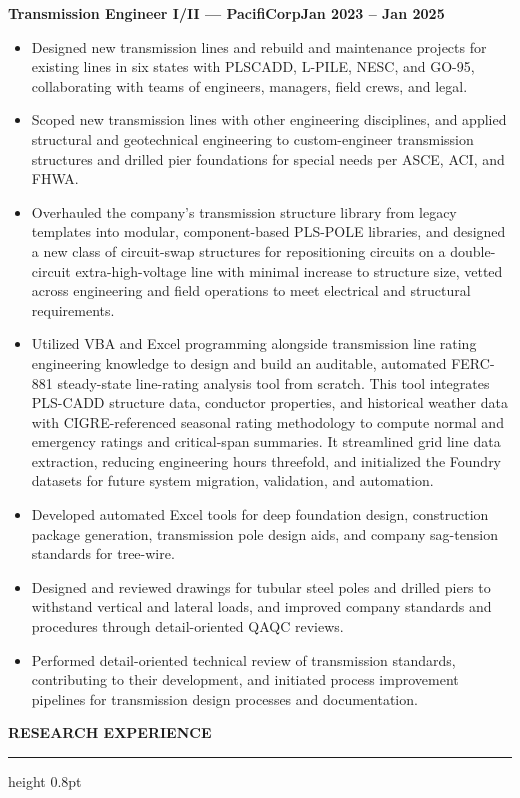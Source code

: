 \documentclass[10pt, letterpaper]{article}
\newcommand{\rsection}[1]{%
  \vspace{8pt}%
  {\large\bfseries\MakeUppercase{#1}}%
  \vspace{1pt}%
  \hrule height 0.8pt%
  \vspace{4pt}%
}
\newcommand{\jobline}[2]{%
  \vspace{5pt}%
  \noindent\textbf{#1}\hfill\textbf{#2}\par%
  \vspace{1pt}%
}
\newenvironment{rlist}{%
  \begin{itemize}[leftmargin=1.4em, itemsep=1pt, topsep=2pt, parsep=0pt]%
}{%
  \end{itemize}%
}
\begin{document}
\jobline{Transmission Engineer I/II --- PacifiCorp}{Jan 2023 -- Jan 2025}
\begin{rlist}
  \item Designed new transmission lines and rebuild and maintenance projects for existing lines in six states with PLSCADD, L-PILE, NESC, and GO-95, collaborating with teams of engineers, managers, field crews, and legal.
  \item Scoped new transmission lines with other engineering disciplines, and applied structural and geotechnical engineering to custom-engineer transmission structures and drilled pier foundations for special needs per ASCE, ACI, and FHWA.
  \item Overhauled the company's transmission structure library from legacy templates into modular, component-based PLS-POLE libraries, and designed a new class of circuit-swap structures for repositioning circuits on a double-circuit extra-high-voltage line with minimal increase to structure size, vetted across engineering and field operations to meet electrical and structural requirements.
  \item Utilized VBA and Excel programming alongside transmission line rating engineering knowledge to design and build an auditable, automated FERC-881 steady-state line-rating analysis tool from scratch. This tool integrates PLS-CADD structure data, conductor properties, and historical weather data with CIGRE-referenced seasonal rating methodology to compute normal and emergency ratings and critical-span summaries. It streamlined grid line data extraction, reducing engineering hours threefold, and initialized the Foundry datasets for future system migration, validation, and automation.
  \item Developed automated Excel tools for deep foundation design, construction package generation, transmission pole design aids, and company sag-tension standards for tree-wire.
  \item Designed and reviewed drawings for tubular steel poles and drilled piers to withstand vertical and lateral loads, and improved company standards and procedures through detail-oriented QAQC reviews.
  \item Performed detail-oriented technical review of transmission standards, contributing to their development, and initiated process improvement pipelines for transmission design processes and documentation.
\end{rlist}

\rsection{Research Experience}
\end{document}
